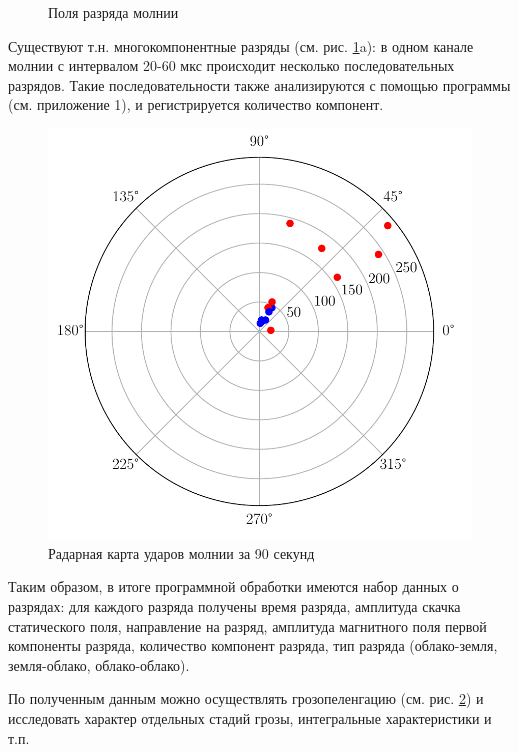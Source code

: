 \documentclass[a4paper,14pt]{extarticle}
\begin{document}
\begin{figure}[h]
\begin{minipage}[h]{0.49\linewidth}
\end{minipage}
\vspace{0.7em}
\caption{Поля разряда молнии}
\label{ris:field}
\end{figure}

Существуют т.н. многокомпонентные разряды (см. рис. \ref{ris:field}a): в одном канале молнии с интервалом 20-60 мкс происходит несколько последовательных разрядов. Такие последовательности также анализируются с помощью программы (см. приложение 1), и регистрируется количество компонент. 

\begin{figure}[H]
  \centering
  \includegraphics[scale=0.9]{fig/str}
  \caption{Радарная карта ударов молнии за 90 секунд}
  \label{fig:strikes_map}
\end{figure}

Таким образом, в итоге программной обработки имеются набор данных о разрядах: для каждого разряда получены время разряда, амплитуда скачка статического поля, направление на разряд, амплитуда магнитного поля первой компоненты разряда, количество компонент разряда, тип разряда (облако-земля, земля-облако, облако-облако). 

По полученным данным можно осуществлять грозопеленгацию (см. рис. \ref{fig:strikes_map}) и исследовать характер отдельных стадий грозы, интегральные характеристики и т.п.
\end{document}

